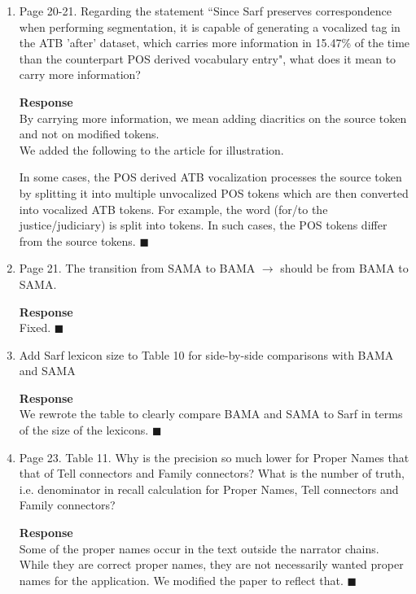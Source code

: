 \begin{enumerate}[leftmargin=0mm,label=\bfseries CommentR1.\arabic*]
\item\label{Review.1.14}
Page 20-21.  Regarding the statement ``Since Sarf preserves correspondence when performing segmentation,  it is capable of generating a vocalized tag in the ATB 'after' dataset, which carries more information in 15.47\% of the time than the counterpart POS derived vocabulary entry",  what does it mean to carry more information?

\textbf{Response}\\
By carrying more information, we mean adding  diacritics on the source token and not on modified tokens. \\
We added the following to the article for illustration.

In some cases, the POS derived ATB vocalization processes the source token by splitting it into multiple unvocalized POS tokens which are then converted into vocalized ATB tokens. 
For example, 
the word  (for/to the justice/judiciary) is split into  tokens. 
In such cases, the POS tokens differ from the source tokens. 
$\blacksquare$

\item\label{Review.1.15}
Page 21. The transition from SAMA to BAMA $\rightarrow$ should be from BAMA to SAMA.

\textbf{Response}\\
Fixed.
$\blacksquare$

\item\label{Review.1.16}
Add Sarf lexicon size to Table 10  for side-by-side comparisons with BAMA and SAMA

\textbf{Response}\\
We rewrote the table to clearly compare BAMA and SAMA to Sarf in terms of the size of the lexicons. 
$\blacksquare$

\item\label{Review.1.17}
Page 23. Table 11. Why is the precision so much lower for Proper Names that that of Tell connectors and Family connectors? What is the number of truth, i.e. denominator in recall calculation for Proper Names, Tell connectors and Family connectors?

\textbf{Response}\\
Some of the proper names occur in the text outside the narrator chains. While they are correct proper names, they are not 
necessarily wanted proper names for the application. We modified the paper to reflect that. 
$\blacksquare$

\end{enumerate}
